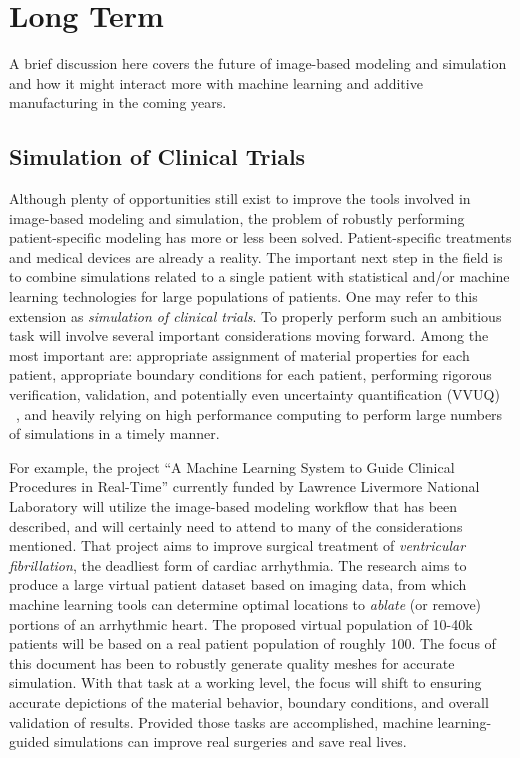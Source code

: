 \section{Long Term}
\label{Long Term}

A brief discussion here covers the future of image-based modeling and simulation and how it might interact more with machine learning and additive manufacturing in the coming years.

\subsection{Simulation of Clinical Trials}
\label{Simulation of Clinical Trials}

Although plenty of opportunities still exist to improve the tools involved in image-based modeling and simulation, the problem of robustly performing patient-specific modeling has more or less been solved. Patient-specific treatments and medical devices are already a reality. The important next step in the field is to combine simulations related to a single patient with statistical and/or machine learning technologies for large populations of patients. One may refer to this extension as \textit{simulation of clinical trials}. To properly perform such an ambitious task will involve several important considerations moving forward. Among the most important are: appropriate assignment of material properties for each patient, appropriate boundary conditions for each patient, performing rigorous verification, validation, and potentially even uncertainty quantification (VVUQ) ~\cite{NAP13395}, and heavily relying on high performance computing to perform large numbers of simulations in a timely manner.

For example, the project ``A Machine Learning System to Guide Clinical Procedures in Real-Time'' currently funded by Lawrence Livermore National Laboratory will utilize the image-based modeling workflow that has been described, and will certainly need to attend to many of the considerations mentioned. That project aims to improve surgical treatment of \textit{ventricular fibrillation}, the deadliest form of cardiac arrhythmia. The research aims to produce a large virtual patient dataset based on imaging data, from which machine learning tools can determine optimal locations to \textit{ablate} (or remove) portions of an arrhythmic heart. The proposed virtual population of 10-40k patients will be based on a real patient population of roughly 100. The focus of this document has been to robustly generate quality meshes for accurate simulation. With that task at a working level, the focus will shift to ensuring accurate depictions of the material behavior, boundary conditions, and overall validation of results. Provided those tasks are accomplished, machine learning-guided simulations can improve real surgeries and save real lives.

